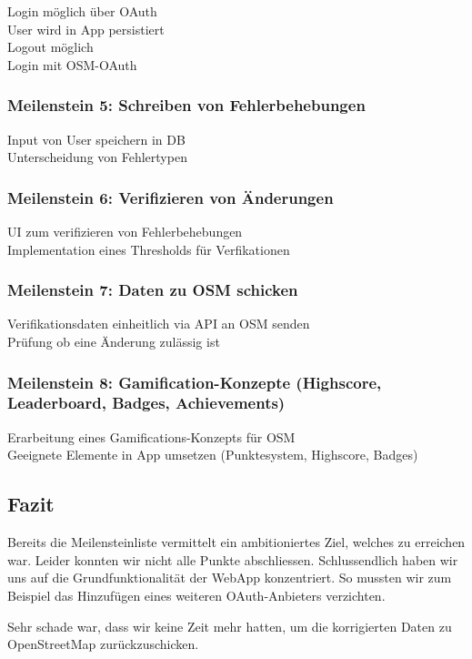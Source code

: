 \tick Login möglich über OAuth \\
\tick User wird in App persistiert \\
\tick Logout möglich \\
\cross Login mit OSM-OAuth

\subsubsection{Meilenstein 5: Schreiben von Fehlerbehebungen}

\tick Input von User speichern in DB \\
\tick Unterscheidung von Fehlertypen

\subsubsection{Meilenstein 6: Verifizieren von Änderungen}

\tick UI zum verifizieren von Fehlerbehebungen \\
\tick Implementation eines Thresholds für Verfikationen

\subsubsection{Meilenstein 7: Daten zu OSM schicken}

\cross Verifikationsdaten einheitlich via API an OSM senden \\
\cross Prüfung ob eine Änderung zulässig ist

\subsubsection{Meilenstein 8: Gamification-Konzepte (Highscore, Leaderboard, Badges, Achievements)}

\tick Erarbeitung eines Gamifications-Konzepts für OSM \\
\tick Geeignete Elemente in App umsetzen (Punktesystem, Highscore, Badges)

\subsection{Fazit}
Bereits die Meilensteinliste vermittelt ein ambitioniertes Ziel, welches zu erreichen war.
Leider konnten wir nicht alle Punkte abschliessen.
Schlussendlich haben wir uns auf die Grundfunktionalität der \gls{WebApp} konzentriert.
So mussten wir zum Beispiel das Hinzufügen eines weiteren \gls{OAuth}-Anbieters verzichten.

Sehr schade war, dass wir keine Zeit mehr hatten, um die korrigierten Daten zu \gls{OpenStreetMap} zurückzuschicken.